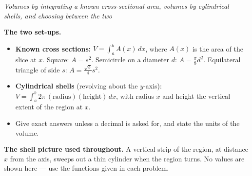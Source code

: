 \documentclass[12pt]{article}
\begin{document}

\begin{center}
\textit{Volumes by integrating a known cross-sectional area, volumes by
cylindrical shells, and choosing between the two}
\end{center}

\noindent\textbf{The two set-ups.}
\begin{itemize}[leftmargin=1.2cm, itemsep=2pt, topsep=2pt]
\item \textbf{Known cross sections:} $V = \displaystyle\int_a^b A(x)\,dx$, where
$A(x)$ is the area of the slice at $x$. Square: $A = s^2$. Semicircle on a
diameter $d$: $A = \tfrac{\pi}{8}d^2$. Equilateral triangle of side $s$:
$A = \tfrac{\sqrt{3}}{4}s^2$.
\item \textbf{Cylindrical shells} (revolving about the $y$-axis):
$V = \displaystyle\int_a^b 2\pi \, (\text{radius})(\text{height})\,dx$, with
radius $x$ and height the vertical extent of the region at $x$.
\item Give exact answers unless a decimal is asked for, and state the units of
the volume.
\end{itemize}

\vspace{0.1cm}
\noindent\textbf{The shell picture used throughout.} A vertical strip of the
region, at distance $x$ from the axis, sweeps out a thin cylinder when the
region turns. No values are shown here --- use the functions given in each
problem.

\begin{center}
\end{center}

\end{document}
